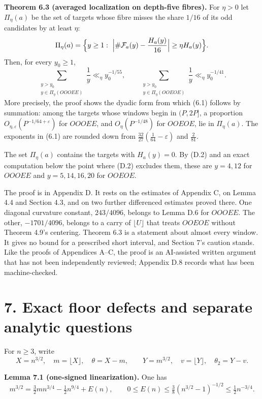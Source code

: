 \documentclass[11pt,a4paper]{article}
\begin{document}
\textbf{Theorem 6.3 (averaged localization on depth-five fibres).} For
\(\eta>0\) let \(\Pi_\eta(a)\) be the set of targets whose fibre misses
the share \(1/16\) of its odd candidates by at least \(\eta\): \[
\Pi_\eta(a)=\Bigl\{y\ge1:\ \Bigl|\#\mathcal F_a(y)
-\frac{H_a(y)}{16}\Bigr|\ge\eta H_a(y)\Bigr\}.
\] Then, for every \(y_0\ge1\), \[
\sum_{\substack{y>y_0\\ y\in\Pi_\eta(OOOEE)}}\frac1y\ll_\eta y_0^{-1/55},
\qquad
\sum_{\substack{y>y_0\\ y\in\Pi_\eta(OOEOE)}}\frac1y\ll_\eta y_0^{-1/41}.
\tag{6.1}
\] More precisely, the proof shows the dyadic form from which (6.1)
follows by summation: among the targets whose windows begin in
\((P,2P]\), a proportion \(O_{\eta,\varepsilon}(P^{-1/64+\varepsilon})\)
for \(OOOEE\), and \(O_\eta(P^{-1/48})\) for \(OOEOE\), lie in
\(\Pi_\eta(a)\). The exponents in (6.1) are rounded down from
\(\tfrac{32}{27}(\tfrac1{64}-\varepsilon)\) and \(\tfrac2{81}\).

The set \(\Pi_\eta(a)\) contains the targets with \(H_a(y)=0\). By (D.2)
and an exact computation below the point where (D.2) excludes them,
these are \(y=4,12\) for \(OOOEE\) and \(y=5,14,16,20\) for \(OOEOE\).

The proof is in Appendix D. It rests on the estimates of Appendix C, on
Lemma 4.4 and Section 4.3, and on two further differenced estimates
proved there. One diagonal curvature constant, \(243/4096\), belongs to
Lemma D.6 for \(OOOEE\). The other, \(-1701/4096\), belongs to a carry
of \(\lfloor U\rfloor\) that treats \(OOEOE\) without Theorem 4.9's
centering. Theorem 6.3 is a statement about almost every window. It
gives no bound for a prescribed short interval, and Section 7's caution
stands. Like the proofs of Appendices A--C, the proof is an AI-assisted
written argument that has not been independently reviewed; Appendix D.8
records what has been machine-checked.

\section{7. Exact floor defects and separate analytic
questions}\label{exact-floor-defects-and-separate-analytic-questions}

For \(n\ge3\), write \[
X=n^{3/2},\quad m=\lfloor X\rfloor,\quad\theta=X-m,
\qquad Y=m^{3/2},\quad v=\lfloor Y\rfloor,\quad\theta_2=Y-v.
\]


\textbf{Lemma 7.1 (one-signed linearization).} One has \[
m^{3/2}=\tfrac32mn^{3/4}-\tfrac12n^{9/4}+E(n),
\qquad
0\le E(n)\le\tfrac38(n^{3/2}-1)^{-1/2}\le\tfrac12n^{-3/4}.
\]
\end{document}
